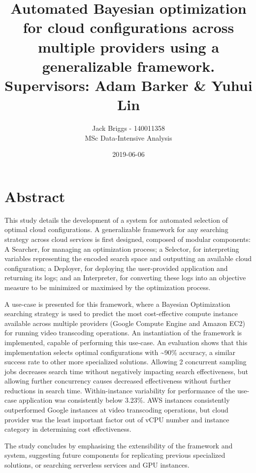 \documentclass{report}
\title{\vspace{-2.0cm} Automated Bayesian optimization for cloud configurations across multiple providers using a generalizable framework. \\ \vspace{0.5cm} \large Supervisors: Adam Barker \& Yuhui Lin}
\date{2019-06-06}
\author{Jack Briggs - 140011358 \\ MSc Data-Intensive Analysis}
\begin{document}
\maketitle
\newpage
\chapter*{Abstract}
This study details the development of a system for automated selection of optimal cloud configurations. A generalizable framework for any searching strategy across cloud services is first designed, composed of modular components: A Searcher, for managing an optimization process; a Selector, for interpreting variables representing the encoded search space and outputting an available cloud configuration; a Deployer, for deploying the user-provided application and returning its logs; and an Interpreter, for converting these logs into an objective measure to be minimized or maximised by the optimization process. 

A use-case is presented for this framework, where a Bayesian Optimization searching strategy is used to predict the most cost-effective compute instance available across multiple providers (Google Compute Engine and Amazon EC2) for running video transcoding operations. An instantiation of the framework is implemented, capable of performing this use-case. An evaluation shows that this implementation selects optimal configurations with \textasciitilde{}90\% accuracy, a similar success rate to other more specialized solutions. Allowing 2 concurrent sampling jobs decreases search time without negatively impacting search effectiveness, but allowing further concurrency causes decreased effectiveness without further reductions in search time. Within-instance variability for performance of the use-case application was consistently below 3.23\%. AWS instances consistently outperformed Google instances at video transcoding operations, but cloud provider was the least important factor out of vCPU number and instance category in determining cost effectiveness.

The study concludes by emphasising the extensibility of the framework and system, suggesting future components for replicating previous specialized solutions, or searching serverless services and GPU instances.
\newpage
\end{document}
